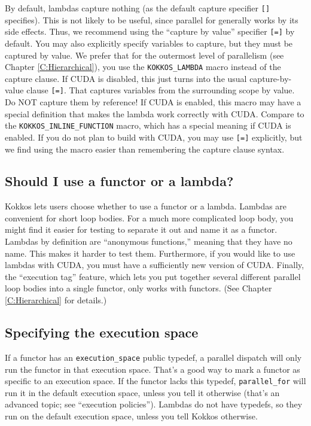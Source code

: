 By default, lambdas capture nothing (as the default capture specifier \lstinline![]! specifies).
This is not likely to be useful, since parallel for generally works by its side effects.
Thus, we recommend using the ``capture by value'' specifier \lstinline![=]! by default.
You may also explicitly specify variables to capture, but they must be captured by value.
We prefer that for the outermost level of parallelism (see Chapter \ref{C:Hierarchical}),
you use the \lstinline!KOKKOS_LAMBDA! macro instead of the capture clause.
If CUDA is disabled, this just turns into the usual capture-by-value clause \lstinline![=]!.
That captures variables from the surrounding scope by value.
Do NOT capture them by reference!
If CUDA is enabled, this macro may have a special definition 
that makes the lambda work correctly with CUDA.
Compare to the \lstinline!KOKKOS_INLINE_FUNCTION! macro,
which has a special meaning if CUDA is enabled.
If you do not plan to build with CUDA, you may use \lstinline![=]! explicitly,
but we find using the macro easier than remembering the capture clause syntax.

\subsection{Should I use a functor or a lambda?}

Kokkos lets users choose whether to use a functor or a lambda.
Lambdas are convenient for short loop bodies.
For a much more complicated loop body,
you might find it easier for testing to separate it out and name it as a functor.
Lambdas by definition are ``anonymous functions,'' meaning that they have no name.
This makes it harder to test them.
Furthermore, if you would like to use lambdas with CUDA,
you must have a sufficiently new version of CUDA.
Finally, the ``execution tag'' feature, which lets you put together several different parallel loop bodies into a single functor,
only works with functors.  (See Chapter \ref{C:Hierarchical} for details.)

\subsection{Specifying the execution space}

If a functor has an \lstinline|execution_space| public typedef, a parallel dispatch will only run the functor in that execution space.
That's a good way to mark a functor as specific to an execution space.  
If the functor lacks this typedef, \lstinline|parallel_for| will run it in the default execution space, unless you tell it otherwise (that's an advanced topic; see ``execution policies'').
Lambdas do not have typedefs, so they run on the default execution space, unless you tell Kokkos otherwise.


